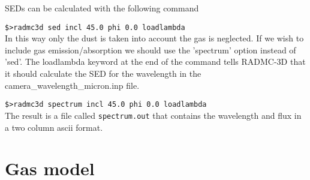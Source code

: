 \documentclass[12pt]{article}
\begin{document}
\begin{itemize}
SEDs can be calculated with the following command

{\tt\$>radmc3d sed incl 45.0 phi 0.0 loadlambda}\\
In this way only the dust is taken into account the gas is neglected. If we wish to include gas emission/absorption
we should use the 'spectrum' option instead of 'sed'. The loadlambda keyword at the end of the command tells
RADMC-3D that it should calculate the SED for the wavelength in the camera\_wavelength\_micron.inp file. 

{\tt\$>radmc3d spectrum incl 45.0 phi 0.0 loadlambda}\\
The result is a file called {\tt spectrum.out} that contains the wavelength and flux in a two column ascii format. 




\end{itemize}


\newpage
\section*{Gas model} 
\end{document}
